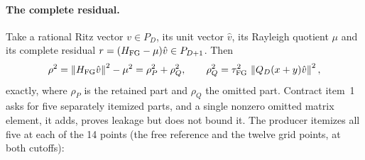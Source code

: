 \paragraph{The complete residual.}
Take a rational Ritz vector $v\in P_D$, its unit vector $\hat v$, its Rayleigh
quotient $\mu$ and its complete residual $r=(H_{\rm FG}-\mu)\hat v\in P_{D+1}$.
Then
\begin{equation}
 \rho^2=\left\lVert H_{\rm FG}\hat v\right\rVert^2-\mu^2=\rho_P^2+\rho_Q^2,\qquad
 \rho_Q^2=\tau_{\mathrm{FG}}^2\,\left\lVert Q_D(x+y)\hat v\right\rVert^2 ,
 \label{eq:az2-residual}
\end{equation}
exactly, where $\rho_P$ is the retained part and $\rho_Q$ the omitted part.
Contract item~1 asks for five separately itemized parts, and a single nonzero
omitted matrix element, it adds, proves leakage but does not bound it. The
producer itemizes all five at each of the 14 points (the free reference and
the twelve grid points, at both cutoffs):
